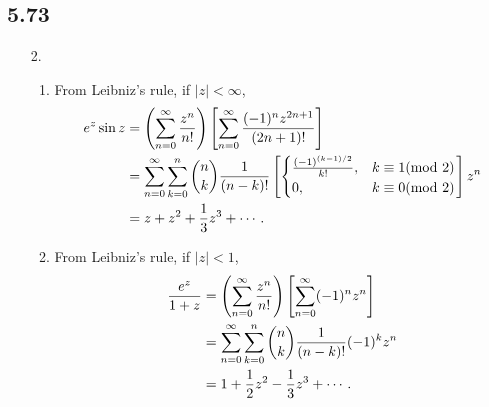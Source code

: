 \documentclass[a4paper,12pt]{article}
\begin{document}
\subsection*{5.73}
\begin{enumerate}
    \item[2.]
        \begin{enumerate}
            \item
                From Leibniz's rule, if $|z| < \infty$,
                \begin{align*}
                    e^z \sin z &= \left( \sum_{n = 0}^\infty \frac{z^n}{n!} \right) \left[ \sum_{n = 0}^\infty \frac{(-1)^n z^{2n + 1}}{(2n + 1)!} \right] \\
                    &= \sum_{n = 0}^\infty \sum_{k = 0}^n \dbinom{n}{k} \frac{1}{(n - k)!} \left[ \begin{cases}
                        \frac{(-1)^{(k - 1)/2}}{k!}, &k \equiv 1 (\text{mod }2) \\
                        0, &k \equiv 0 (\text{mod }2)
                    \end{cases} \right] z^n \\
                    &= z + z^2 + \frac{1}{3} z^3 + \cdots.
                \end{align*}

            \item
                From Leibniz's rule, if $|z| < 1$,
                \begin{align*}
                    \frac{e^z}{1 + z} &= \left( \sum_{n = 0}^\infty \frac{z^n}{n!} \right) \left[ \sum_{n = 0}^\infty (-1)^n z^n \right] \\
                    &= \sum_{n = 0}^\infty \sum_{k = 0}^n \dbinom{n}{k} \frac{1}{(n - k)!} (-1)^k z^n \\
                    &= 1 + \frac{1}{2} z^2 - \frac{1}{3} z^3 + \cdots.
                \end{align*}
        \end{enumerate}


\end{enumerate}
\end{document}
